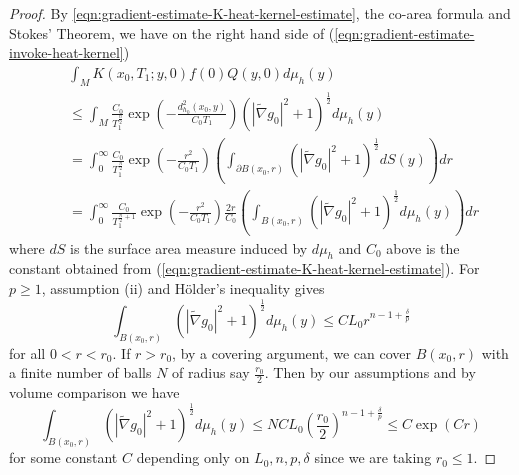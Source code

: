 \documentclass[12pt]{amsart}
\theoremstyle{plain}
\theoremstyle{plain}
\theoremstyle{definition}
\theoremstyle{remark}
\numberwithin{equation}{subsection}
\newcommand{\hdel}{\tilde{\nabla}}
\begin{document}
\begin{proof}
    By \eqref{eqn:gradient-estimate-K-heat-kernel-estimate}, the co-area formula and Stokes' Theorem, we have on the right hand side of (\ref{eqn:gradient-estimate-invoke-heat-kernel})
    \begin{align}\label{eqn:gradient-estimate-Q-heat-kernel-estimate2}
        &\int_{M} K(x_0, T_1; y, 0)f(0)Q(y,0)d\mu_h(y) \nonumber \\
        \quad& \leq \int_{M} \frac{C_0}{T_1^{\frac{n}{2}}}\exp\left(-\frac{d^2_{h_0}(x_0, y)}{C_0 T_1}\right)\left(|\hdel g_0|^2 +1\right)^{\frac{1}{2}}d\mu_h(y) \nonumber \\
        &= \int_0^{\infty} \frac{C_0}{T_1^{\frac{n}{2}}}\exp\left(-\frac{r^2}{C_0 T_1}\right)\left(\int_{\partial B(x_0, r)}\left(|\hdel g_0|^2 + 1\right)^{\frac{1}{2}}dS(y)\right)dr \nonumber \\
        &= \int_0^{\infty} \frac{C_0}{T_1^{\frac{n}{2}+1}}\exp\left(-\frac{r^2}{C_0 T_1}\right)\frac{2r}{C_0}\left(\int_{B(x_0, r)}\left(|\hdel g_0|^2 + 1\right)^{\frac{1}{2}}d\mu_h(y)\right)dr
    \end{align}
    where $dS$ is the surface area measure induced by $d\mu_h$ and $C_0$ above is the constant obtained from (\ref{eqn:gradient-estimate-K-heat-kernel-estimate}). For $p \geq 1$, assumption (ii) and H\"older's inequality gives
    \begin{equation*}
        \int_{B(x_0, r)} \left(|\hdel g_0|^2 + 1\right)^{\frac{1}{2}}d\mu_h(y) \leq CL_0r^{n-1+\frac{\delta}{p}}
    \end{equation*}
    for all $0<r<r_0$. If $r>r_0$, by a covering argument, we can cover $B(x_0, r)$ with a finite number of balls $N$ of radius say $\frac{r_0}{2}$. Then by our assumptions and by volume comparison we have
    \begin{equation*}
        \int_{B(x_0, r)} \left(|\hdel g_0|^2 + 1\right)^{\frac{1}{2}}d\mu_h(y) \leq NCL_0\left(\frac{r_0}{2}\right)^{n-1+\frac{\delta}{p}} \leq C\exp(Cr)
    \end{equation*}
    for some constant $C$ depending only on $L_0, n, p, \delta$ since we are taking $r_0\leq 1$.
   

\end{proof}
\end{document}
